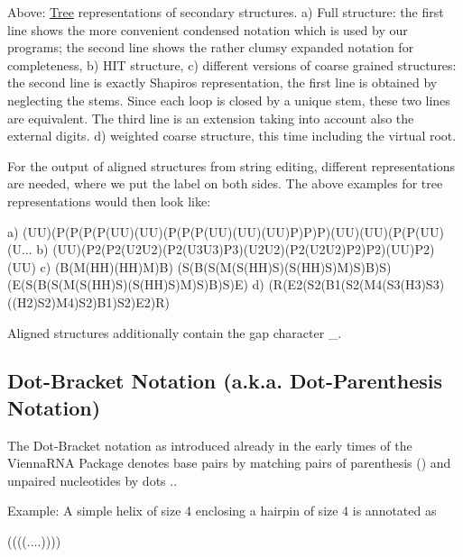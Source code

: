 Above\+: \mbox{\hyperlink{struct_tree}{Tree}} representations of secondary structures. a) Full structure\+: the first line shows the more convenient condensed notation which is used by our programs; the second line shows the rather clumsy expanded notation for completeness, b) H\+IT structure, c) different versions of coarse grained structures\+: the second line is exactly Shapiro\textquotesingle{}s representation, the first line is obtained by neglecting the stems. Since each loop is closed by a unique stem, these two lines are equivalent. The third line is an extension taking into account also the external digits. d) weighted coarse structure, this time including the virtual root.

For the output of aligned structures from string editing, different representations are needed, where we put the label on both sides. The above examples for tree representations would then look like\+:

\begin{DoxyVerb}a) (UU)(P(P(P(P(UU)(UU)(P(P(P(UU)(UU)(UU)P)P)P)(UU)(UU)(P(P(UU)(U...
b) (UU)(P2(P2(U2U2)(P2(U3U3)P3)(U2U2)(P2(U2U2)P2)P2)(UU)P2)(UU)
c) (B(M(HH)(HH)M)B)
   (S(B(S(M(S(HH)S)(S(HH)S)M)S)B)S)
   (E(S(B(S(M(S(HH)S)(S(HH)S)M)S)B)S)E)
d) (R(E2(S2(B1(S2(M4(S3(H3)S3)((H2)S2)M4)S2)B1)S2)E2)R)
\end{DoxyVerb}


Aligned structures additionally contain the gap character \textquotesingle{}\+\_\+\textquotesingle{}.\hypertarget{rna_structure_notations_dot-bracket-notation}{}\subsection{Dot-\/\+Bracket Notation (a.\+k.\+a. Dot-\/\+Parenthesis Notation)}\label{rna_structure_notations_dot-bracket-notation}
The Dot-\/\+Bracket notation as introduced already in the early times of the Vienna\+R\+NA Package denotes base pairs by matching pairs of parenthesis {\ttfamily ()} and unpaired nucleotides by dots {\ttfamily .}.

Example\+: A simple helix of size 4 enclosing a hairpin of size 4 is annotated as \begin{DoxyVerb}((((....))))
\end{DoxyVerb}


